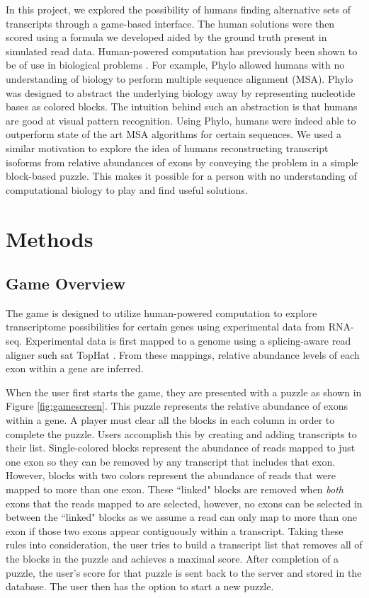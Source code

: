 \documentclass[12pt]{article}
\begin{document}
In this project, we explored the possibility of humans finding alternative sets of transcripts through a game-based interface. The human solutions were then scored using a formula we developed aided by the ground truth present in simulated read data. Human-powered computation has previously been shown to be of use in biological problems \citep{kawrykow2012phylo, cooper2010predicting}. For example, Phylo allowed humans with no understanding of biology to perform multiple sequence alignment (MSA). Phylo was designed to abstract the underlying biology away by representing nucleotide bases as colored blocks.  The intuition behind such an abstraction is that humans are good at visual pattern recognition. Using Phylo, humans were indeed able to outperform state of the art MSA algorithms for certain sequences. We used a similar motivation to explore the idea of humans reconstructing transcript isoforms from relative abundances of exons by conveying the problem in a simple block-based puzzle. This makes it possible for a person with no understanding of computational biology to play and find useful solutions. 

\section*{Methods}

\subsection*{Game Overview}
The game is designed to utilize human-powered computation to explore transcriptome possibilities for certain genes using experimental data from
RNA-seq. Experimental data is first mapped to a genome using a splicing-aware read aligner such sat TopHat \citep{trapnell2009tophat}. From these mappings,
relative abundance levels of each exon within a gene are inferred.

When the user first starts the game, they are presented with a puzzle as shown in Figure \ref{fig:gamescreen}. This puzzle represents
the relative abundance of exons within a gene. A player must clear all the blocks in each column in order to complete the puzzle. Users accomplish this by 
creating and adding transcripts to their list. Single-colored blocks represent the abundance of reads mapped to just one exon so they can be removed by any 
transcript that includes that exon. However, blocks with two colors represent the abundance of reads that were mapped to more than one exon. These ``linked"
blocks are removed when \emph{both} exons that the reads mapped to are selected, however, no exons can be selected in between the ``linked" blocks as
we assume a read can only map to more than one exon if those two exons appear contiguously within a transcript. Taking these rules into consideration, the user
tries to build a transcript list that removes all of the blocks in the puzzle and achieves a maximal score. After completion of a puzzle, the user's score for that puzzle is
sent back to the server and stored in the database. The user then has the option to start a new puzzle.
\end{document}
